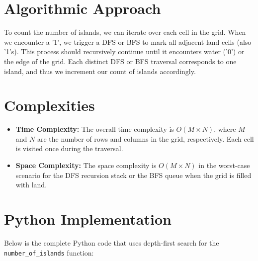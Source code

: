 \section*{Algorithmic Approach}
To count the number of islands, we can iterate over each cell in the grid. When we encounter a '1', we trigger a DFS or BFS to mark all adjacent land cells (also '1's). This process should recursively continue until it encounters water ('0') or the edge of the grid. Each distinct DFS or BFS traversal corresponds to one island, and thus we increment our count of islands accordingly.
    
    
\section*{Complexities}
\begin{itemize}
    \item \textbf{Time Complexity:} The overall time complexity is \(O(M \times N)\), where \(M\) and \(N\) are the number of rows and columns in the grid, respectively. Each cell is visited once during the traversal.
    \item \textbf{Space Complexity:} The space complexity is \(O(M \times N)\) in the worst-case scenario for the DFS recursion stack or the BFS queue when the grid is filled with land.
\end{itemize}
    
\newpage %
\section*{Python Implementation}
    
    
Below is the complete Python code that uses depth-first search for the \texttt{number\_of\_islands} function:
    
